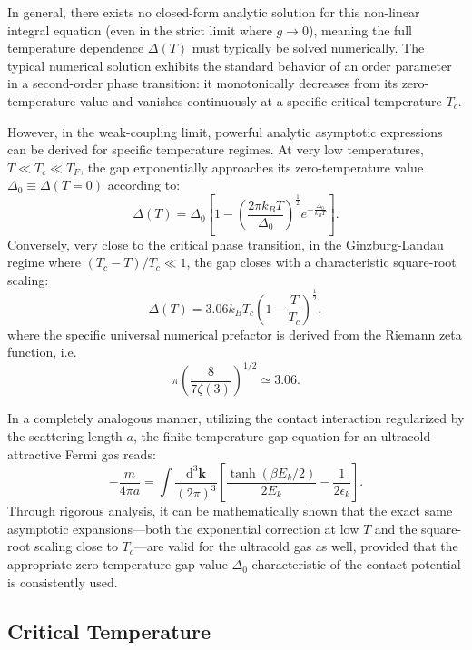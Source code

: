 In general, there exists no closed-form analytic solution for this non-linear integral equation (even in the strict limit where \( g \to 0 \)), meaning the full temperature dependence \( \Delta(T) \) must typically be solved numerically. The typical numerical solution exhibits the standard behavior of an order parameter in a second-order phase transition: it monotonically decreases from its zero-temperature value and vanishes continuously at a specific critical temperature \( T_c \).

However, in the weak-coupling limit, powerful analytic asymptotic expressions can be derived for specific temperature regimes. At very low temperatures, \( T \ll T_c \ll T_F \), the gap exponentially approaches its zero-temperature value \( \Delta_0 \equiv \Delta(T=0) \) according to:
\[
    \Delta(T) = \Delta_0 \left[ 1 - \left(\frac{2\pi k_B T}{\Delta_0}\right)^{\frac{1}{2}} e^{-\frac{\Delta_0}{k_B T}} \right].
\]
Conversely, very close to the critical phase transition, in the Ginzburg-Landau regime where \( (T_c - T)/T_c \ll 1 \), the gap closes with a characteristic square-root scaling:
\[
    \Delta(T) = 3.06 k_B T_c \left(1 - \frac{T}{T_c}\right)^{\frac{1}{2}},
\]
where the specific universal numerical prefactor is derived from the Riemann zeta function, i.e.
\[
    \pi \left( \frac{8}{7\zeta(3)} \right)^{1/2} \simeq 3.06.
\]

In a completely analogous manner, utilizing the contact interaction regularized by the scattering length \( a \), the finite-temperature gap equation for an ultracold attractive Fermi gas reads:
\begin{equation} \label{eq:ultracold_finite_t_gap}
    -\frac{m}{4\pi a} = \int \frac{\mathrm{d}^3\mathbf{k}}{(2\pi)^3} \left[ \frac{\tanh(\beta E_k / 2)}{2E_k} - \frac{1}{2\epsilon_k} \right].
\end{equation}
Through rigorous analysis, it can be mathematically shown that the exact same asymptotic expansions—both the exponential correction at low \( T \) and the square-root scaling close to \( T_c \)—are valid for the ultracold gas as well, provided that the appropriate zero-temperature gap value \( \Delta_0 \) characteristic of the contact potential is consistently used.

\subsection{Critical Temperature}

